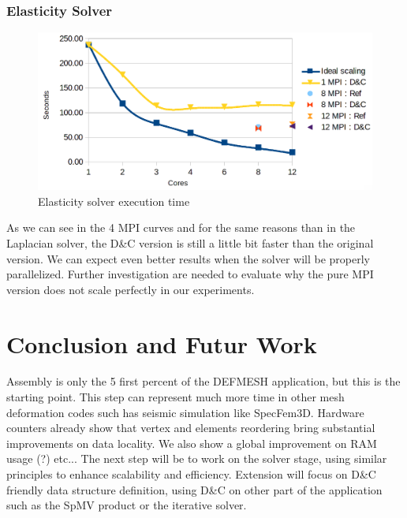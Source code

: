 \documentclass{IOS-Book-Article}
\begin{document}
\subsubsection{Elasticity Solver}
\begin{figure}[htp]
 \centering
 \label{fig9}
 \includegraphics[scale=0.2]{Elasticity_solver_time.png}
 \caption{Elasticity solver execution time}
\end{figure}
As we can see in the 4 MPI curves and for the same reasons than in the Laplacian solver, the D\&C version is still a little bit faster than the original version.
We can expect even better results when the solver will be properly parallelized.
Further investigation are needed to evaluate why the pure MPI version does not scale perfectly in our experiments.

\section{Conclusion and Futur Work}
Assembly is only the 5 first percent of the DEFMESH application, but this is the starting point.
This step can represent much more time in other mesh deformation codes such has seismic simulation like SpecFem3D.
Hardware counters already show that vertex and elements reordering bring substantial improvements on data locality.
We also show a global improvement on RAM usage (?) etc...
The next step will be to work on the solver stage, using similar principles to enhance scalability and efficiency.
Extension will focus on D\&C friendly data structure definition, using D\&C on other part of the application such as the SpMV product or the iterative solver. 



\end{document}

